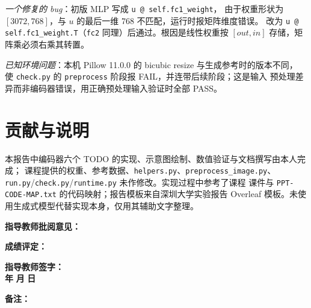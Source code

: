 \documentclass[a4paper,12pt]{article}
\begin{document}
\emph{一个修复的 bug}：初版 MLP 写成 \texttt{u @ self.fc1\_weight}，
由于权重形状为 $[3072,768]$，与 $u$ 的最后一维 768 不匹配，运行时报矩阵维度错误。
改为 \texttt{u @ self.fc1\_weight.T}（\texttt{fc2} 同理）后通过。根因是线性权重按
$[out,in]$ 存储，矩阵乘必须右乘其转置。

\emph{已知环境问题}：本机 Pillow 11.0.0 的 bicubic resize 与生成参考时的版本不同，
使 \texttt{check.py} 的 \texttt{preprocess} 阶段报 FAIL，并连带后续阶段；这是输入
预处理差异而非编码器错误，用正确预处理输入验证时全部 PASS。

\section{贡献与说明}

本报告中编码器六个 TODO 的实现、示意图绘制、数值验证与文档撰写由本人完成；
课程提供的权重、参考数据、\texttt{helpers.py}、\texttt{preprocess\_image.py}、
\texttt{run.py}/\texttt{check.py}/\texttt{runtime.py} 未作修改。实现过程中参考了课程
课件与 \texttt{PPT-CODE-MAP.txt} 的代码映射；报告模板来自深圳大学实验报告
Overleaf 模板。未使用生成式模型代替实现本身，仅用其辅助文字整理。

\newpage


\vspace{1cm}
\noindent \textbf{指导教师批阅意见：}
\vspace{6cm}
\hfill

\vspace{1cm}
\noindent \textbf{成绩评定：}
\vspace{2cm}
\hfill

\vspace{1cm}
\noindent
\hfill
\textbf{指导教师签字：}\quad\quad\quad\quad\quad\\[0.5cm]
\hfill
\textbf{年}\quad\quad
\textbf{月}\quad\quad
\textbf{日}\quad

\vspace{1cm}
\noindent \textbf{备注：}

\end{document}
